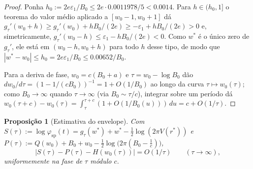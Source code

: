 \documentclass[11pt]{amsart}
\theoremstyle{plain}
\newtheorem{proposition}[theorem]{Proposição}
\theoremstyle{definition}
\theoremstyle{remark}
\begin{document}
\begin{proof}
Ponha $h_0 := 2e\varepsilon_1/B_0 \le 2e\cdot0.0011978/5 < 0.0014$. Para $h\in(h_0,1]$ o teorema do
valor médio aplicado a $[w_0-1,w_0+1]$ dá $g_\tau'(w_0+h) \ge g_\tau'(w_0)+hB_0/(2e) \ge
-\varepsilon_1 + hB_0/(2e) > 0$ e, simetricamente, $g_\tau'(w_0-h) \le \varepsilon_1-hB_0/(2e) < 0$.
Como $w^*$ é o único zero de $g_\tau'$, ele está em $(w_0-h,w_0+h)$ para todo $h$ desse tipo, de
modo que $|w^*-w_0| \le h_0 = 2e\varepsilon_1/B_0 \le 0.00652/B_0$.

Para a deriva de fase, $w_0=c(B_0+a)$ e $\tau=w_0-\log B_0$ dão $dw_0/d\tau = (1-1/(cB_0))^{-1} =
1+O(1/B_0)$ ao longo da curva $\tau\mapsto w_0(\tau)$; como $B_0\to\infty$ quando $\tau\to\infty$
(via $B_0\sim\tau/c$), integrar sobre um período dá $w_0(\tau+c)-w_0(\tau) =
\int_\tau^{\tau+c}(1+O(1/B_0(u)))\,du = c+O(1/\tau)$.
\end{proof}

\begin{proposition}[Estimativa do envelope]
\label{prop:envelope}
Com $S(\tau) := \log\varphi_{\mathrm{sp}}(t) = g_\tau(w^*)+w^*-\tfrac12\log(2\pi V(r^*))$ e
$P(\tau) := Q(w_0)+B_0+w_0-\tfrac12\log\bigl(2\pi(B_0-\tfrac1c)\bigr)$,
\[
|S(\tau) - P(\tau) - H(w_0(\tau))| = O(1/\tau) \qquad (\tau\to\infty),
\]
uniformemente na fase de $\tau$ módulo $c$.
\end{proposition}
\end{document}
